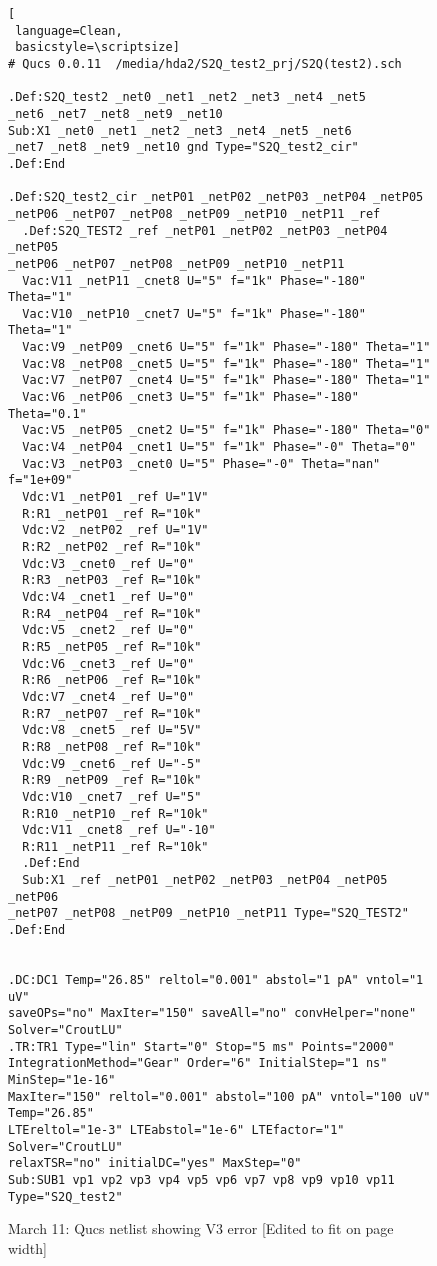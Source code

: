 \begin{figure} 
  \centering
\begin{lstlisting}[
 language=Clean, 
 basicstyle=\scriptsize]
# Qucs 0.0.11  /media/hda2/S2Q_test2_prj/S2Q(test2).sch

.Def:S2Q_test2 _net0 _net1 _net2 _net3 _net4 _net5 
_net6 _net7 _net8 _net9 _net10
Sub:X1 _net0 _net1 _net2 _net3 _net4 _net5 _net6 
_net7 _net8 _net9 _net10 gnd Type="S2Q_test2_cir"
.Def:End

.Def:S2Q_test2_cir _netP01 _netP02 _netP03 _netP04 _netP05 
_netP06 _netP07 _netP08 _netP09 _netP10 _netP11 _ref
  .Def:S2Q_TEST2 _ref _netP01 _netP02 _netP03 _netP04 _netP05 
_netP06 _netP07 _netP08 _netP09 _netP10 _netP11
  Vac:V11 _netP11 _cnet8 U="5" f="1k" Phase="-180" Theta="1"
  Vac:V10 _netP10 _cnet7 U="5" f="1k" Phase="-180" Theta="1"
  Vac:V9 _netP09 _cnet6 U="5" f="1k" Phase="-180" Theta="1"
  Vac:V8 _netP08 _cnet5 U="5" f="1k" Phase="-180" Theta="1"
  Vac:V7 _netP07 _cnet4 U="5" f="1k" Phase="-180" Theta="1"
  Vac:V6 _netP06 _cnet3 U="5" f="1k" Phase="-180" Theta="0.1"
  Vac:V5 _netP05 _cnet2 U="5" f="1k" Phase="-180" Theta="0"
  Vac:V4 _netP04 _cnet1 U="5" f="1k" Phase="-0" Theta="0"
  Vac:V3 _netP03 _cnet0 U="5" Phase="-0" Theta="nan" f="1e+09" 
  Vdc:V1 _netP01 _ref U="1V"
  R:R1 _netP01 _ref R="10k"
  Vdc:V2 _netP02 _ref U="1V"
  R:R2 _netP02 _ref R="10k"
  Vdc:V3 _cnet0 _ref U="0" 
  R:R3 _netP03 _ref R="10k"
  Vdc:V4 _cnet1 _ref U="0"
  R:R4 _netP04 _ref R="10k"
  Vdc:V5 _cnet2 _ref U="0"
  R:R5 _netP05 _ref R="10k"
  Vdc:V6 _cnet3 _ref U="0"
  R:R6 _netP06 _ref R="10k"
  Vdc:V7 _cnet4 _ref U="0"
  R:R7 _netP07 _ref R="10k"
  Vdc:V8 _cnet5 _ref U="5V"
  R:R8 _netP08 _ref R="10k"
  Vdc:V9 _cnet6 _ref U="-5"
  R:R9 _netP09 _ref R="10k"
  Vdc:V10 _cnet7 _ref U="5"
  R:R10 _netP10 _ref R="10k"
  Vdc:V11 _cnet8 _ref U="-10"
  R:R11 _netP11 _ref R="10k"
  .Def:End
  Sub:X1 _ref _netP01 _netP02 _netP03 _netP04 _netP05 _netP06 
_netP07 _netP08 _netP09 _netP10 _netP11 Type="S2Q_TEST2"
.Def:End


.DC:DC1 Temp="26.85" reltol="0.001" abstol="1 pA" vntol="1 uV" 
saveOPs="no" MaxIter="150" saveAll="no" convHelper="none" Solver="CroutLU"
.TR:TR1 Type="lin" Start="0" Stop="5 ms" Points="2000" 
IntegrationMethod="Gear" Order="6" InitialStep="1 ns" MinStep="1e-16" 
MaxIter="150" reltol="0.001" abstol="100 pA" vntol="100 uV" Temp="26.85" 
LTEreltol="1e-3" LTEabstol="1e-6" LTEfactor="1" Solver="CroutLU" 
relaxTSR="no" initialDC="yes" MaxStep="0"
Sub:SUB1 vp1 vp2 vp3 vp4 vp5 vp6 vp7 vp8 vp9 vp10 vp11 Type="S2Q_test2"
\end{lstlisting}
 \caption{March 11: Qucs netlist showing V3 error [Edited to fit on page width]}
  \label{fig:S2Qtest2_2}
\end{figure} 



